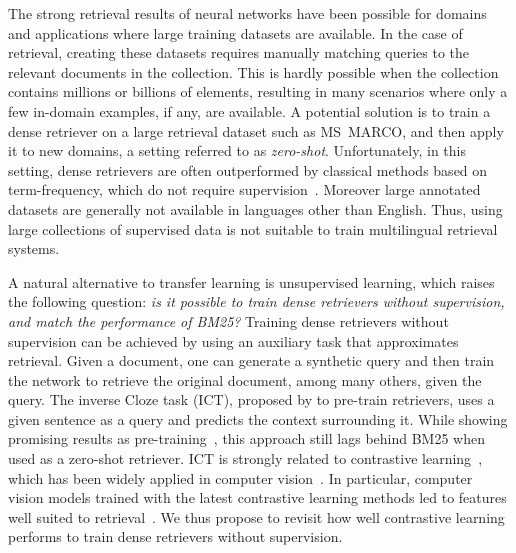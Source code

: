 \documentclass[10pt]{article} %
\begin{document}
The strong retrieval results of neural networks have been possible for domains and applications where large training datasets are available.
In the case of retrieval, creating these datasets requires manually matching queries to the relevant documents in the collection.
This is hardly possible when the collection contains millions or billions of elements, resulting in many scenarios where only a few in-domain examples, if any, are available.
A potential solution is to train a dense retriever on a large retrieval dataset such as MS~MARCO, and then apply it to new domains, a setting referred to as \emph{zero-shot}.
Unfortunately, in this setting, dense retrievers are often outperformed by classical methods based on term-frequency, which do not require supervision~\citep{thakur2021beir}.
Moreover large annotated datasets are generally not available in languages other than English.
Thus, using large collections of supervised data is not suitable to train multilingual retrieval systems.

A natural alternative to transfer learning is unsupervised learning, which raises the following question:
\emph{is it possible to train dense retrievers without supervision, and match the performance of BM25?}
Training dense retrievers without supervision can be achieved by using an auxiliary task that approximates retrieval.
Given a document, one can generate a synthetic query and then train the network to retrieve the original document, among many others, given the query.
The inverse Cloze task (ICT), proposed by \citet{lee2019latent} to pre-train retrievers, uses a given sentence as a query and predicts the context surrounding it.
While showing promising results as pre-training~\citep{chang2020pre,sachan2021endtoend}, this approach still lags behind BM25 when used as a zero-shot retriever.
ICT is strongly related to contrastive learning~\citep{wu2018unsupervised}, which has been widely applied in computer vision~\citep{chen2020simple,he2020momentum}.
In particular, computer vision models trained with the latest contrastive learning methods led to features well suited to retrieval~\citep{caron2021emerging}.
We thus propose to revisit how well contrastive learning performs to train dense retrievers without supervision.
\end{document}
